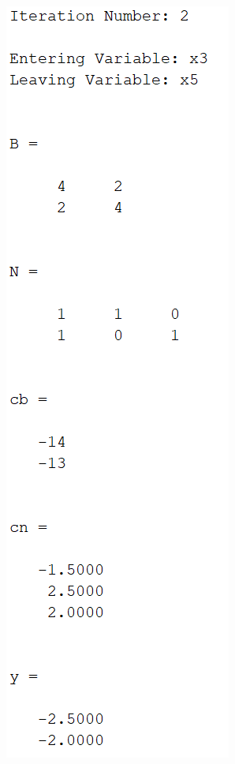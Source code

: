 \documentclass{article}
\begin{document}
\begin{itemize}
\begin{itemize}
\begin{center}
            \includegraphics[scale = 0.65]{iteration2Prob1}

\end{center}
\end{itemize}
\end{itemize}
\end{document}
